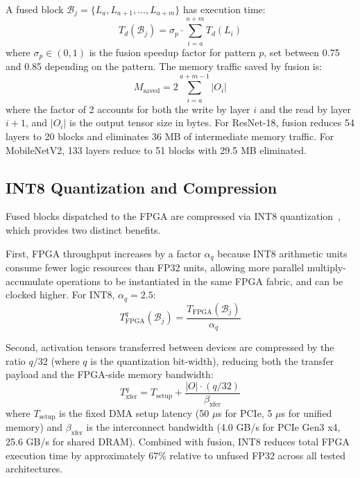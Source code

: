 \documentclass[runningheads]{llncs}
\begin{document}
A fused block $\mathcal{B}_j = \{L_a, L_{a+1}, \ldots, L_{a+m}\}$ has execution time:
\begin{equation}\label{eq:fusion_time}
    T_d(\mathcal{B}_j) = \sigma_p \cdot \sum_{i=a}^{a+m} T_d(L_i)
\end{equation}
where $\sigma_p \in (0, 1)$ is the fusion speedup factor for pattern $p$, set between 0.75 and 0.85 depending on the pattern. The memory traffic saved by fusion is:
\begin{equation}
    M_{\text{saved}} = 2 \sum_{i=a}^{a+m-1} |O_i|
\end{equation}
where the factor of 2 accounts for both the write by layer $i$ and the read by layer $i+1$, and $|O_i|$ is the output tensor size in bytes. For ResNet-18, fusion reduces 54 layers to 20 blocks and eliminates 36 MB of intermediate memory traffic. For MobileNetV2, 133 layers reduce to 51 blocks with 29.5 MB eliminated.

\subsection{INT8 Quantization and Compression}\label{sec:quantization}

Fused blocks dispatched to the FPGA are compressed via INT8 quantization~\cite{jacob2018,krishnamoorthi2018}, which provides two distinct benefits.

First, FPGA throughput increases by a factor $\alpha_q$ because INT8 arithmetic units consume fewer logic resources than FP32 units, allowing more parallel multiply-accumulate operations to be instantiated in the same FPGA fabric, and can be clocked higher. For INT8, $\alpha_q = 2.5$:
\begin{equation}\label{eq:quant_speedup}
    T_{\text{FPGA}}^{q}(\mathcal{B}_j) = \frac{T_{\text{FPGA}}(\mathcal{B}_j)}{\alpha_q}
\end{equation}

Second, activation tensors transferred between devices are compressed by the ratio $q/32$ (where $q$ is the quantization bit-width), reducing both the transfer payload and the FPGA-side memory bandwidth:
\begin{equation}\label{eq:transfer}
    T_{\text{xfer}}^{q} = T_{\text{setup}} + \frac{|O| \cdot (q/32)}{\beta_{\text{xfer}}}
\end{equation}
where $T_{\text{setup}}$ is the fixed DMA setup latency (50 $\mu$s for PCIe, 5 $\mu$s for unified memory) and $\beta_{\text{xfer}}$ is the interconnect bandwidth (4.0 GB/s for PCIe Gen3 x4, 25.6 GB/s for shared DRAM). Combined with fusion, INT8 reduces total FPGA execution time by approximately 67\% relative to unfused FP32 across all tested architectures.
\end{document}
